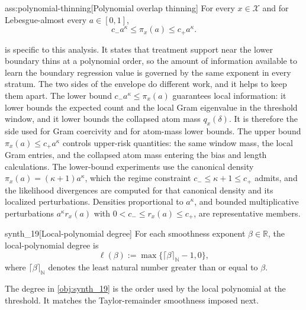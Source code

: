 \begin{assumptionv}{ass:polynomial-thinning}[Polynomial overlap thinning]
For every \(x\in\mathcal X\) and for Lebesgue-almost every \(a\in[0,1]\),
\[
c_- a^\kappa \leq \pi_x(a) \leq c_+ a^\kappa .
\]
\end{assumptionv}

 is specific to this analysis. It states that treatment support near the lower boundary thins at a polynomial order, so the amount of information available to learn the boundary regression value is governed by the same exponent in every stratum. The two sides of the envelope do different work, and it helps to keep them apart. The lower bound \(c_-a^\kappa\le\pi_x(a)\) guarantees local information: it lower bounds the expected count and the local Gram eigenvalue in the threshold window, and it lower bounds the collapsed atom mass \(q_x(\delta)\). It is therefore the side used for Gram coercivity and for atom-mass lower bounds. The upper bound \(\pi_x(a)\le c_+a^\kappa\) controls upper-risk quantities: the same window mass, the local Gram entries, and the collapsed atom mass entering the bias and length calculations. The lower-bound experiments use the canonical density \(\pi_x(a)=(\kappa+1)a^\kappa\), which the regime constraint \(c_-\le\kappa+1\le c_+\) admits, and the likelihood divergences are computed for that canonical density and its localized perturbations. Densities proportional to \(a^\kappa\), and bounded multiplicative perturbations \(a^\kappa r_x(a)\) with \(0<c_-\le r_x(a)\le c_+\), are representative members.

\begin{definitionv}{synth_19}[Local-polynomial degree]
For each smoothness exponent \(\beta\in\mathbb R\), the local-polynomial degree is
\[
\ell(\beta):=\max\{\lceil\beta\rceil_{\mathbb N}-1,0\},
\]
where \(\lceil\beta\rceil_{\mathbb N}\) denotes the least natural number greater than or equal to \(\beta\).
\end{definitionv}

The degree  in \cref{obj:synth_19} is the order used by the local polynomial at the threshold. It matches the Taylor-remainder smoothness imposed next.

